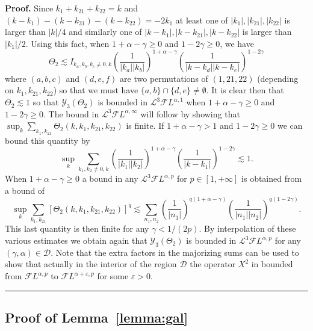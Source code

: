 \documentclass[a4paper,11pt,reqno]{article}
\newcommand{\eps}{\varepsilon}
\newcommand{\DD}{\mathcal{D}}
\newcommand{\FF}{\mathcal{F}}
\newcommand{\LL}{\mathcal{L}}
\newcommand{\YY}{\mathcal{Y}}
\newenvironment{proof}[1][Proof]{\textbf{#1.} }{\ \rule{0.5em}{0.5em}}
\begin{document}
\begin{proof}
 Since $k_1+k_{21}+k_{22}=k$ and $(k-k_1)-(k-k_{21})-(k-k_{22}) = -2 k_1 $ at least one of $|k_1|,|k_{21}|,|k_{22}|$ is larger than $|k|/4$ and similarly one of $|k-k_1|,|k-k_{21}|,|k-k_{22}|$ is larger than $|k_1|/2$. Using this fact,
when $1+\alpha-\gamma \ge 0$ and $1-2\gamma \ge0$,  we have
$$
\Theta_2 \lesssim I_{k_a,k_{b},k_{c} \neq 0,k}
\left( \frac{1}{|k_a||k_b|}\right)^{1+\alpha-\gamma}
\left( \frac{1}{|k-k_d||k-k_e|}\right)^{1-2\gamma}
$$
where $(a,b,c)$ and $(d,e,f)$ are two permutations of $(1,21,22)$ (depending on $k_1,k_{21},k_{22}$) so that we must have $\{a,b\} \cap \{d,e\} \neq \emptyset$.
It is clear then that $\Theta_2 \lesssim 1$ so that $\YY_3(\Theta_2)$ is bounded in $\LL^3\FF L^{\alpha,1}$ when
$1+\alpha-\gamma \ge 0$ and $1-2\gamma \ge0$.
The bound in $\LL^3 \FF L^{\alpha,\infty}$ will follow by showing that
$
\sup_k \sum_{k_1,k_{21}} \Theta_2(k,k_1,k_{21},k_{22})
$
is finite. If $1+\alpha-\gamma > 1$ and $1-2\gamma \ge 0$ we can bound this quantity by
$$
\sup_k \sum_{k_1,k_2 \neq 0,k} \left( \frac{1}{|k_1||k_{2}|}\right)^{1+\alpha-\gamma} \left( \frac{1}{|k-k_1|}\right)^{1-2\gamma} \lesssim 1 .
$$
When $1+\alpha-\gamma \ge 0$ a bound in any $\LL^3 \FF L^{\alpha,p}$ for $p\in [1,+\infty]$ is obtained from a bound of
$$
\sup_k \sum_{k_1,k_{21}} 
[ \Theta_2(k,k_1,k_{21},k_{22}) ]^{q} \lesssim \sum_{n_1,n_2}  \left( \frac{1}{|n_1|}\right)^{q(1+\alpha-\gamma)}
\left( \frac{1}{|n_1||n_2|}\right)^{q(1-2\gamma)} .
$$
 This last 
quantity is then finite for  any $\gamma < 1/(2p)$.
By interpolation of these various estimates we obtain again that $\YY_3(\Theta_2)$ is bounded in $\LL^3 \FF L^{\alpha,p}$ for any $(\gamma,\alpha) \in \DD$. Note that the extra factors in the majorizing sums can be used to show that actually in the interior of the region $\DD$ the operator $X^2$ in bounded from $\FF L^{\alpha,p}$ to $\FF L^{\alpha+\eps,p}$ for some $\eps>0$. 
\end{proof}

\subsection{Proof of Lemma~\ref{lemma:gal}}
\end{document}
